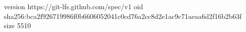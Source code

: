 version https://git-lfs.github.com/spec/v1
oid sha256:bca2f926719986f0b6606052041c0cd76a2cc8d2e1ac9c71aeaa6d2f16b2b63f
size 5510
